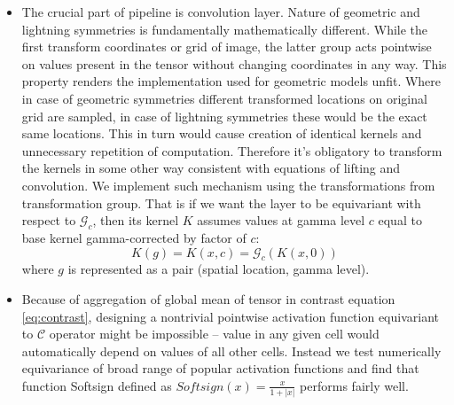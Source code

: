 \begin{itemize}
\item
The crucial part of pipeline is convolution layer. Nature of geometric
and lightning symmetries is fundamentally mathematically different. While
the first
transform coordinates or grid of image, the latter group acts pointwise on
values present in the tensor without changing coordinates in any way.
This property renders the implementation used for geometric models unfit.
Where in case of geometric symmetries different transformed locations
on original grid are sampled, in case of lightning symmetries these would be the
exact same locations. This in turn would cause creation of identical kernels and
unnecessary repetition of computation. Therefore it's obligatory to transform the
kernels in some other way consistent with equations of lifting and convolution.
We implement such mechanism using the transformations from transformation group.
That is if we want the layer to be equivariant with respect to
$\mathcal{G}_c$, then its kernel $K$ assumes values at gamma level $c$ equal to
base kernel gamma-corrected by factor of $c$:
\begin{equation}
    K(g) = K(x,c) = \mathcal{G}_c(K(x,0))
\end{equation}
where $g$ is represented as a pair (spatial location, gamma level).

\item Because of aggregation of global mean of tensor in contrast equation \ref{eq:contrast},
    designing a nontrivial pointwise activation function equivariant to
    $\mathcal{C}$ operator
    might be impossible -- value in any given cell would automatically depend on
    values of all other cells. Instead we test numerically equivariance of broad
    range of popular activation functions and find that function Softsign
    defined as $\mathit{Softsign}(x) = \frac{x}{1+|x|}$ performs fairly well.


\end{itemize}
